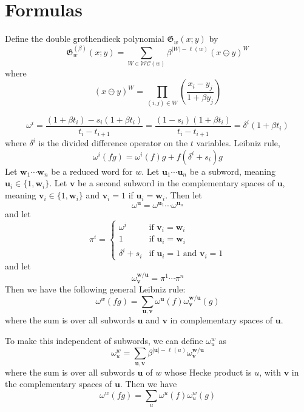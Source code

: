 \documentclass{amsart}
\theoremstyle{definition}
\theoremstyle{remark}
\numberwithin{equation}{subsection}
\newcommand{\WC}{\mathcal{WC}}
\begin{document}



\section{Formulas}

Define the double grothendieck polynomial $\mathfrak{G}_w(x;y)$ by
$$\mathfrak{G}_w^{(\beta)}(x;y) = \sum_{W\in\WC(w)}\beta^{|W|-\ell(w)}(x\ominus y)^W$$
where 
$$(x\ominus y)^{W} = \prod_{(i, j)\in W}\left(\frac{x_i - y_j}{1+\beta y_j}\right)$$

$$\omega^i = \frac{(1+\beta t_i) - s_i(1+\beta t_{i})}{t_i - t_{i+1}}=\frac{(1 - s_i)(1+\beta t_i)}{t_i - t_{i+1}} = \delta^i(1 + \beta t_i)$$
where $\delta^i$ is the divided difference operator on the $t$ variables. Leibniz rule,
$$\omega^i(fg) = \omega^i(f)g + f(\delta^i + s_i)g$$
Let $\mathbf{w}_1\cdots\mathbf{w}_n$ be a reduced word for $w$. Let $\mathbf{u}_1\cdots \mathbf{u}_n$ be a subword, meaning $\mathbf{u}_i\in\{1,\mathbf{w}_i\}$. Let $\mathbf{v}$ be a second subword in the complementary spaces of $\mathbf{u}$, meaning $\mathbf{v}_i\in\{1,\mathbf{w}_i\}$ and $\mathbf{v}_i = 1$ if $\mathbf{u}_i = \mathbf{w}_i$. Then let
$$\omega^{\mathbf{u}} = \omega^{\mathbf{u}_1}\cdots \omega^{\mathbf{u}_n}$$
and let
$$\pi^i=\begin{cases}
\omega^i & \text{if }\mathbf{v}_i=\mathbf{w}_i\\
1 & \text{if }\mathbf{u}_i=\mathbf{w}_i\\
\delta^i + s_i & \text{if }\mathbf{u}_i=1\text{ and }\mathbf{v}_i=1
\end{cases}$$
and let
$$\omega^{\mathbf{w}/\mathbf{u}}_{\mathbf{v}} = \pi^1\cdots \pi^n$$
Then we have the following general Leibniz rule:
$$\omega^w(fg) = \sum_{\mathbf{u},\mathbf{v}}\omega^{\mathbf{u}}(f)\omega^{\mathbf{w}/\mathbf{u}}_{\mathbf{v}}(g)$$
where the sum is over all subwords $\mathbf{u}$ and $\mathbf{v}$ in complementary spaces of $\mathbf{u}$.

To make this independent of subwords, we can define $\omega^w_u$ as
$$\omega^w_u = \sum_{\mathbf{u},\mathbf{v}}\beta^{|\mathbf{u}| - \ell(u)}\omega^{\mathbf{w}/\mathbf{u}}_{\mathbf{v}}$$
where the sum is over all subwords $\mathbf{u}$ of $w$ whose Hecke product is $u$, with $\mathbf{v}$ in the complementary spaces of $\mathbf{u}$. Then we have
$$\omega^w(fg) = \sum_{u}\omega^u(f)\omega^w_u(g)$$
\end{document}
